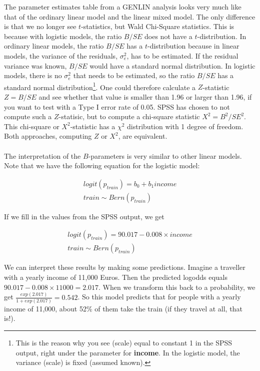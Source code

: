 \documentclass[]{book}\usepackage[]{graphicx}\usepackage[]{color}
\begin{document}
The parameter estimates table from a GENLIN analysis looks very much like that of the ordinary linear model and the linear mixed model. The only difference is that we no longer see $t$-statistics, but Wald Chi-Square statistics. This is because with logistic models, the ratio $B/SE$ does not have a $t$-distribution. In ordinary linear models, the ratio $B/SE$ has a $t$-distribution because in linear models, the variance of the residuals, $\sigma^2_e$, has to be estimated. If the residual variance was known, $B/SE$ would have a standard normal distribution. In logistic models, there is no $\sigma^2_e$ that needs to be estimated, so the ratio $B/SE$ has a standard normal distribution\footnote{This is the reason why you see (scale) equal to constant 1 in the SPSS output, right under the parameter for \textbf{income}. In the logistic model, the variance (scale) is fixed (assumed known).}. One could therefore calculate a $Z$-statistic $Z=B/SE$ and see whether that value is smaller than 1.96 or larger than 1.96, if you want to test with a Type I error rate of 0.05. SPSS has chosen to not compute such a $Z$-statisic, but to compute a chi-square statistic $X^2= B^2/SE^2$. This chi-square or $X^2$-statistic has a $\chi^2$ distribution with 1 degree of freedom. Both approaches, computing $Z$ or $X^2$, are equivalent.
\\
\\
The interpretation of the $B$-parameters is very similar to other linear models. Note that we have the following equation for the logistic model:



\begin{eqnarray}
logit(p_{train}) = b_0 + b_1 income \nonumber \\
train \sim Bern(p_{train})
\end{eqnarray}

If we fill in the values from the SPSS output, we get


\begin{eqnarray}
logit(p_{train}) = 90.017 - 0.008 \times income \nonumber \\
train \sim Bern(p_{train})
\end{eqnarray}


We can interpret these results by making some predictions. Imagine a traveller with a yearly income of 11,000 Euros. Then the predicted logodds equals $90.017 - 0.008 \times 11000= 2.017$. When we transform this back to a probability, we get $\frac{exp(2.017) } {1+ exp(2.017) }= 0.542  $. So this model predicts that for people with a yearly income of 11,000, about 52\% of them take the train (if they travel at all, that is!).
\end{document}
